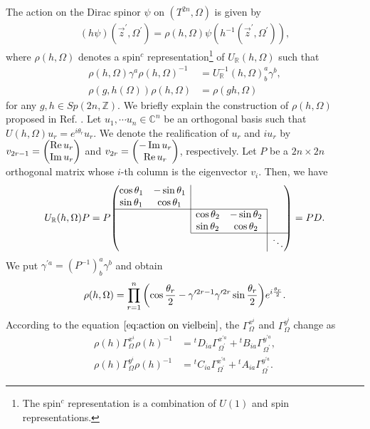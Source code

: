 \documentclass[11pt]{article}
\begin{document}
The action on the Dirac spinor $\psi$ on $(T^{2n},\Omega)$ is given by
\begin{align}
   (h\psi)(\vec{z}^\prime,\Omega^\prime)= \rho(h,\Omega) \psi(h^{-1}(\vec{z}^\prime,\Omega^\prime)) \label{eq:action on spinor},
\end{align}
where $\rho(h,\Omega)$ denotes a spin$^c$ representation\footnote{The spin$^c$ representation is a combination of $U(1)$ and spin representations.} of $U_\mathbb{R}(h,\Omega)$ such that
\begin{align}
    \rho(h,\Omega)\gamma^a \rho(h,\Omega)^{-1}&= U_\mathbb{R}^{-1}(h,\Omega)^a_b \gamma^b, \label{eq:property of rho(h)}\\
    \rho(g, h(\Omega)) \rho(h,\Omega)&=\rho(gh, \Omega)
\end{align}
for any $g,h \in Sp(2n ,\mathbb{Z})$. 
We briefly explain the construction of $\rho(h,\Omega)$ proposed in Ref. \cite{Atiyah:1964zzClifford}. Let $u_1,\cdots u_n \in \mathbb{C}^n$ be an orthogonal basis such that $U(h,\Omega) u_r= e^{i\theta_r} u_r$. We denote the realification of $u_r$ and $iu_r$ by $v_{2r-1}=\mqty(\Re u_r \\ \Im u_r)$ and $v_{2r}=\mqty(-\Im u_r \\ \Re u_r)$, respectively. Let $P$ be a $2n \times 2n$ orthogonal matrix whose $i$-th column is the eigenvector $v_i$. Then, we have
\begin{align}
    U_\mathbb{R}(h,\Omega) P= P \mqty( \cos \theta_1 & \multicolumn{1}{c|}{-\sin \theta_1} &  &  &  \\ 
\sin \theta_1 & \multicolumn{1}{c|}{\cos \theta_1} &  &  &  \\ \cline{1-4}
 &  & \multicolumn{1}{|c}{\cos \theta_2} & \multicolumn{1}{c|}{-\sin \theta_2} &  \\ 
 &  & \multicolumn{1}{|c}{\sin \theta_2} & \multicolumn{1}{c|}{\cos \theta_2} &  \\ \cline{3-5}
 &  &  &  & \multicolumn{1}{|c}{\ddots} \\ )=PD.
\end{align}
We put $\gamma^{\prime a}= (P^{-1})^a_b \gamma^b$ and obtain
\begin{align}
    \rho(h,\Omega)= \prod_{r=1}^n \qty(\cos \frac{\theta_r}{2} - \gamma^{\prime 2r-1} \gamma^{\prime 2r}\sin \frac{\theta_r}{2}) e^{i\frac{\theta_r}{2}}.
\end{align}
According to the equation $\eqref{eq:action on vielbein}$, the $\Gamma_\Omega^{x^i}$ and $\Gamma_\Omega^{y^i}$ change as
\begin{align}
    \rho(h) \Gamma_\Omega^{x^i} \rho(h)^{-1}&= {}^tD_{ia} \Gamma^{x^{\prime a}}_{\Omega^\prime} + {}^tB_{ia} \Gamma^{y^{\prime a}}_{\Omega^\prime} ,\\
    \rho(h) \Gamma_\Omega^{y^i} \rho(h)^{-1}&= {}^tC_{ia} \Gamma^{x^{\prime a}}_{\Omega^\prime} + {}^tA_{ia} \Gamma^{y^{\prime a}}_{\Omega^\prime}.
\end{align}
\end{document}

